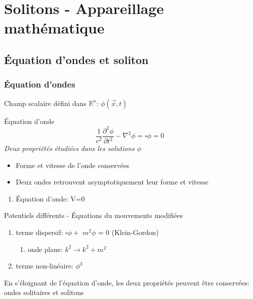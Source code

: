 \documentclass[handout]{beamer}
\begin{document}
\section{Solitons - Appareillage mathématique }

\subsection{Équation d'ondes et soliton}
\begin{frame}
\frametitle{Équation d'ondes}
Champ scalaire défini dans $\mathbb{R}^n$: $\phi(\vec{x},t)$\\
\begin{block}{Équation d'onde}
\begin{equation}
\frac{1}{c^2}\frac{\partial^2 \phi}{\partial t^2} - \nabla^2 \phi = \square \phi = 0 
\end{equation}
\textit{Deux propriétés étudiées dans les solutions $\phi$}
\begin{itemize}
\item Forme et vitesse de l'onde conservées\\
\item Deux ondes retrouvent asymptotiquement leur forme et vitesse\\
\end{itemize}
\end{block} 
\end{frame}

\begin{frame}
\begin{enumerate}
\item Équation d'onde: V=0
\end{enumerate}

\begin{block}{Potentiels différents - Équations du mouvements modifiées}
\begin{enumerate}

\item terme dispersif: $\square\phi +$ \boldmath $m^2 \phi $ \unboldmath  = 0 (Klein-Gordon)\\
\begin{enumerate}
\item onde plane: $k^2 \rightarrow k^2+m^2$

\end{enumerate}
\item terme non-linéaire: $\phi^3$ \\
\end{enumerate}
\end{block}
En s'éloignant de l'équation d'onde, les deux propriétés peuvent être conservées: ondes solitaires et solitons 

\end{frame}
\end{document}
